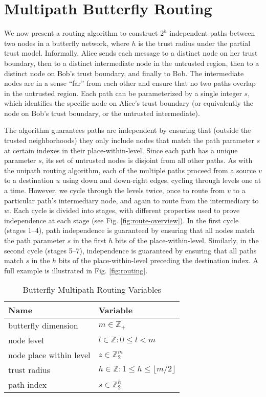 \documentclass[10pt,letterpaper]{article}
\begin{document}
\section*{Multipath Butterfly Routing}
\label{sec-bf-route}

We now present a routing algorithm to construct $2^h$ independent paths
between two nodes in a butterfly network,
where $h$ is the trust radius under the partial trust model.
Informally, Alice sends each message to a distinct node on her
trust boundary, then to a distinct intermediate node in the untrusted region,
then to a distinct node on Bob's trust boundary, and finally to Bob.
The intermediate nodes are in a sense ``far'' from each other and ensure that
no two paths overlap in the untrusted region.
Each path can be parameterized by a single integer $s$, which identifies
the specific node on Alice's trust boundary
(or equivalently the node on Bob's trust boundary, or the untrusted intermediate).

The algorithm guarantees paths are independent by ensuring that
(outside the trusted neighborhoods)
they only include
nodes that match the path parameter $s$ at certain indexes in their
place-within-level.
Since each path has a unique parameter $s$,
its set of untrusted nodes is disjoint from all other paths.
As with the unipath routing algorithm,
each of the multiple paths proceed from a source $v$ to a destination $u$
using down and down-right edges,
cycling through levels one at a time.
However, we cycle through the levels twice, once to route from $v$ to a
particular path's intermediary node,
and again to route from the intermediary to $w$.
Each cycle is divided into stages,
with different properties used to prove independence at each stage
(see Fig. \ref{fig:route-overview}).
In the first cycle (stages 1--4), path independence is guaranteed by ensuring that
all nodes match the path parameter $s$ in the first $h$ bits of the place-within-level.
Similarly, in the second cycle (stages 5--7),
independence is guaranteed by ensuring that all paths match $s$ in the
$h$ bits of the place-within-level preceding the destination index.
A full example is illustrated in Fig. \ref{fig:routing}.

\begin{table}[h!]
\caption{Butterfly Multipath Routing Variables\label{tab:routing}}
\begin{center}
\begin{tabular}{ll}
Name & Variable \\\hline
butterfly dimension & $m \in \mathbb{Z}_+$ \\
node level & $l \in \mathbb{Z} : 0 \leq l < m$ \\
node place within level & $z \in \mathbb{Z}_2^m$ \\
trust radius & $h \in \mathbb{Z} : 1 \leq h \leq \lfloor m/2 \rfloor$ \\
path index & $s \in \mathbb{Z}_2^h$ \\
\end{tabular}
\end{center}
\end{table}
\end{document}
